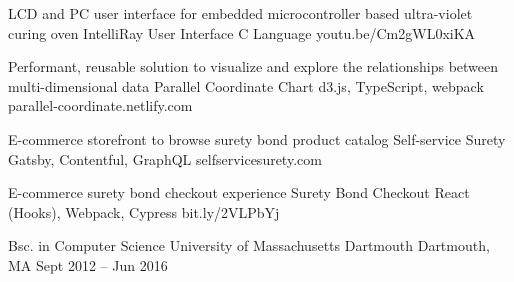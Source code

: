 \documentclass[]{awesome-cv}
\begin{document}
\vspace{-7mm}
\begin{cventries}
	\cventry
	{LCD and PC user interface for embedded microcontroller based ultra-violet curing oven}
	{IntelliRay User Interface}
	{C Language}
	{youtu.be/Cm2gWL0xiKA}
	{}
	
	\vspace{-5mm}
	\cventry
	{Performant, reusable solution to visualize and explore the relationships between multi-dimensional data}
	{Parallel Coordinate Chart}
	{d3.js, TypeScript, webpack}
	{parallel-coordinate.netlify.com}
	{}
	
	\vspace{-5mm}
	\cventry
	{E-commerce storefront to browse surety bond product catalog}
	{Self-service Surety}
	{Gatsby, Contentful, GraphQL}
	{selfservicesurety.com}
	{}
	
	\vspace{-5mm}
	\cventry
	{E-commerce surety bond checkout experience}
	{Surety Bond Checkout}
	{React (Hooks), Webpack, Cypress}
	{bit.ly/2VLPbYj}
	{}
	
	\vspace{-5mm}
\end{cventries}
\begin{cventries}
	\cventry
	{Bsc. in Computer Science}
	{University of Massachusetts Dartmouth}
	{Dartmouth, MA}
	{Sept 2012 – Jun 2016}
	{}
\end{cventries}

\vspace{-2mm}

\ 
\end{document}
